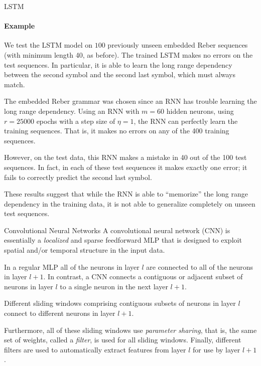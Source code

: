 \begin{frame}{LSTM}
\framesubtitle{Example}
%
    We test the LSTM model on $100$ previously unseen embedded Reber
    sequences (with minimum length 40, as before). The trained LSTM makes no
    errors on the test sequences. In particular, it is able to learn the
    long range dependency between the second symbol and the second last
    symbol, which must always match.

\medskip
    
    The embedded Reber grammar was chosen since an RNN has trouble
    learning the long range dependency. 
    Using an RNN with $m=60$ hidden neurons, using $r=25000$ epochs
    with a step size of $\eta=1$, the RNN can perfectly learn the training
    sequences. That is, it makes no errors on any of the 400 training
    sequences. 

\medskip

However, on the test data, this RNN makes a mistake in
    40
    out of the 100 test sequences. In fact, in each of these test
    sequences it makes exactly one error; it fails
    to correctly predict the second last symbol. 

\medskip

These results suggest that
    while the RNN is able to ``memorize'' the long range dependency in
    the training data, it is not able to generalize completely on unseen
    test sequences.
\end{frame}
%
%
\begin{frame}{Convolutional Neural Networks}
A convolutional neural network (CNN) is essentially a {\em localized}
and sparse
feedforward MLP that is designed to exploit spatial and/or temporal 
structure in the
input data. 

\medskip

In a regular MLP all of the neurons in layer $l$ are
connected to all of the neurons in layer $l+1$. In contrast, a CNN 
connects a contiguous or adjacent subset of neurons in layer
$l$ to a single neuron in the next layer $l+1$. 

\medskip

Different sliding
windows comprising contiguous subsets of neurons in layer $l$ connect to
different neurons in layer $l+1$. 

\medskip

Furthermore, all of these sliding
windows use
{\em parameter sharing}, that is, the same set of weights, called a {\em
filter}, is used for
all sliding windows. Finally, different filters are used to
automatically extract features from layer $l$ for use
by layer $l+1$.
\end{frame}
